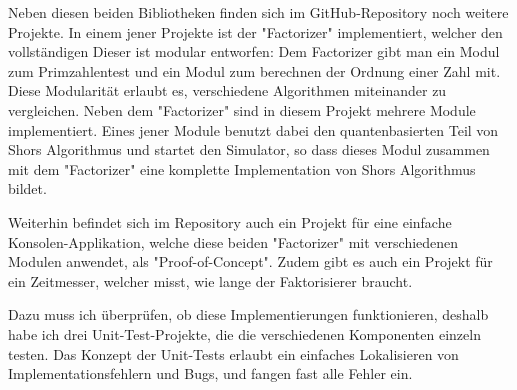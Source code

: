 Neben diesen beiden Bibliotheken finden sich im GitHub-Repository noch weitere Projekte. In einem jener Projekte ist der "Factorizer" implementiert, welcher den vollständigen  Dieser ist modular entworfen: Dem Factorizer gibt man ein Modul zum Primzahlentest und ein Modul zum berechnen der Ordnung einer Zahl mit. Diese Modularität erlaubt es, verschiedene Algorithmen miteinander zu vergleichen. Neben dem "Factorizer" sind in diesem Projekt mehrere Module implementiert. Eines jener Module benutzt dabei den quantenbasierten Teil von Shors Algorithmus und startet den Simulator, so dass dieses Modul zusammen mit dem "Factorizer" eine komplette Implementation von Shors Algorithmus bildet.

Weiterhin befindet sich im Repository auch ein Projekt für eine einfache Konsolen-Applikation, welche diese beiden "Factorizer" mit verschiedenen Modulen anwendet, als "Proof-of-Concept". Zudem gibt es auch ein Projekt für ein Zeitmesser, welcher misst, wie lange der Faktorisierer braucht.

Dazu muss ich überprüfen, ob diese Implementierungen funktionieren, deshalb habe ich drei Unit-Test-Projekte, die die verschiedenen Komponenten einzeln testen. Das Konzept der Unit-Tests erlaubt ein einfaches Lokalisieren von Implementationsfehlern und Bugs, und fangen fast alle Fehler ein.